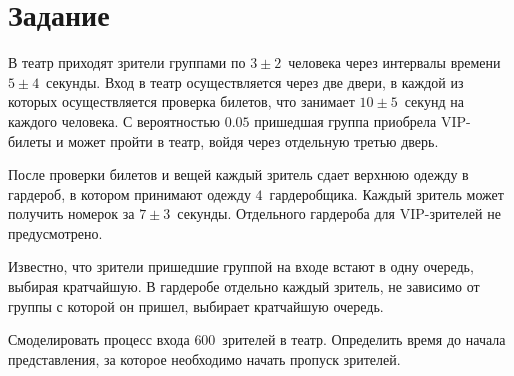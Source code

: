 \chapter{Задание}

В театр приходят зрители группами по $3\pm2$~человека через интервалы времени
$5\pm4$~секунды. Вход в театр осуществляется через две двери, в каждой из
которых осуществляется проверка билетов, что занимает $10\pm5$~секунд на
каждого человека. С вероятностью $0.05$ пришедшая группа приобрела VIP-билеты и
может пройти в театр, войдя через отдельную третью дверь.

После проверки билетов и вещей каждый зритель сдает верхнюю одежду в гардероб, в
котором принимают одежду $4$~гардеробщика. Каждый зритель может получить номерок
за $7\pm3$~секунды. Отдельного гардероба для VIP-зрителей не предусмотрено.

Известно, что зрители пришедшие группой на входе встают в одну очередь, выбирая
кратчайшую. В гардеробе отдельно каждый зритель, не зависимо от группы с которой
он пришел, выбирает кратчайшую очередь.

Смоделировать процесс входа $600$~зрителей в театр. Определить время до начала
представления, за которое необходимо начать пропуск зрителей.


